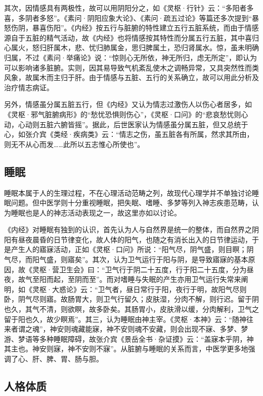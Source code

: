 \documentclass[12pt]{ctexbook}
\begin{document}
其次，因情感具有两极性，故可以用阴阳分之，如《灵枢·行针》云：“多阳者多喜，多阴者多怒”。《素问·阴阳应象大论》、《素问·疏五过论》等篇还多次提到“暴怒伤阴，暴喜伤阳”。《内经》按五行与脏腑的特性建立五行五脏系统，而由于情感源自于五脏的精气活动，故《内经》也将情感按其特性而分属五行五脏，其中喜归心属火，怒归肝属木，悲、忧归肺属金，思归脾属土，恐归肾属水。惊，虽未明确归属，不过《素问·举痛论》说：“惊则心无所依，神无所归，虑无所定”，即认为可以影响诸多脏腑。实则，因其易导致气机紊乱使木之调畅异常，又具突然性而类风象，故属木而主归于肝。由于情感与五脏、五行的关系确立，故可以用此分析及治疗情志病证。

另外，情感虽分属五脏五行，但《内经》又认为情志过激伤人以伤心者居多，如《灵枢·邪气脏腑病形》的“愁忧恐惧则伤心”，《灵枢·口问》的“悲哀愁忧则心动，心动则五脏六腑皆摇”。据此，后世医家认为情感虽分属五脏，但又总统于心，如张介宾《类经·疾病类》云：“情志之伤，虽五脏各有所属，然求其所由，则无不从心而发……此所以五志惟心所使也”。

\subsection{睡眠}%

睡眠本属于人的生理过程，不在心理活动范畴之列，故现代心理学并不单独讨论睡眠问题。但中医学则十分重视睡眠，把失眠、嗜睡、多梦等列入神志疾患范畴，认为睡眠也是人的神志活动表现之一，故这里亦如以讨论。

《内经》对睡眠有独到的认识，首先认为人与自然界是统一的整体，而自然界之阴阳有昼夜晨昏的日节律变化，故人体的阳气，也随之有消长出入的日节律运动，于是产生人的寤寐活动，正如《灵枢·口问》所说：“阳气尽，阴气盛，则目瞑；阴气尽，而阳气盛，则寤矣”。其次，认为卫气运行于阳与阴，是导致寤寐的基本原因，故《灵枢·营卫生会》曰：“卫气行于阴二十五度，行于阳二十五度，分为昼夜，故气至阳而起，至阴而至”。而对嗜睡与失眠的产生亦用卫气运行失常来阐明，如《灵枢·大惑论》云：“卫气者，昼日常行于阳，夜行于明，故阳气尽则卧，阴气尽则寤。故肠胃大，则卫气行留久；皮肤湿，分肉不解，则行迟。留于阴也久，其气不清，则欲瞑，故多卧矣。其肠胃小，皮肤滑以缓，分肉解利，卫气之留于阳也久，故少瞑焉”。其三，认为睡眠由神主宰。《灵枢·本神》云：“随神往来者谓之魂”，神安则魂藏能寐，神不安则魂不安藏，则会出现不寐、多梦、梦游、梦语等多种睡眠障碍，故张介宾《景岳全书·杂证摸》云：“盖寐本乎阴，神其主也。神安则寐，神不安则不寐”。从脏腑与睡眠的关系而言，中医学更多地强调了心、肝、脾、胃、肠与胆。

\subsection{人格体质}%
\end{document}
